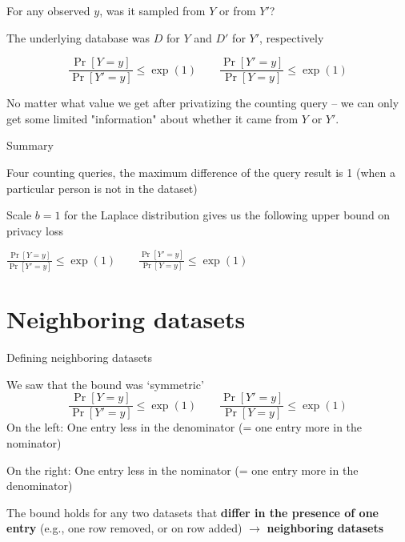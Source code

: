 \documentclass[12pt,aspectratio=169,handout]{beamer}
\begin{document}
\begin{frame}{For any observed $y$, was it sampled from $Y$ or from $Y'$?}

The underlying database was $D$ for $Y$ and $D'$ for $Y'$, respectively

$$
\frac{\Pr[Y = y]}{\Pr[Y' = y]} \leq \exp(1) \qquad
\frac{\Pr[Y' = y]}{\Pr[Y = y]} \leq \exp(1)
$$

No matter what value we get after privatizing the counting query -- we can only get some limited "information" about whether it came from $Y$ or $Y'$.

\end{frame}



\begin{frame}{Summary}

Four counting queries, the maximum difference of the query result is 1 (when a particular person is not in the dataset)

Scale $b = 1$ for the Laplace distribution gives us the following upper bound on privacy loss

$
\frac{\Pr[Y = y]}{\Pr[Y' = y]} \leq \exp(1) \qquad
\frac{\Pr[Y' = y]}{\Pr[Y = y]} \leq \exp(1)
$

\end{frame}


\section{Neighboring datasets}

\begin{frame}{Defining neighboring datasets}
	
We saw that the bound was `symmetric'
$$
\frac{\Pr[Y = y]}{\Pr[Y' = y]} \leq \exp(1) \qquad
\frac{\Pr[Y' = y]}{\Pr[Y = y]} \leq \exp(1)
$$
On the left: One entry less in the denominator (= one entry more in the nominator)

On the right: One entry less in the nominator (= one entry more in the denominator)

The bound holds for any two datasets that \textbf{differ in the presence of one entry} (e.g., one row removed, or on row added) $\rightarrow$ \textbf{neighboring datasets}


\end{frame}
\end{document}
